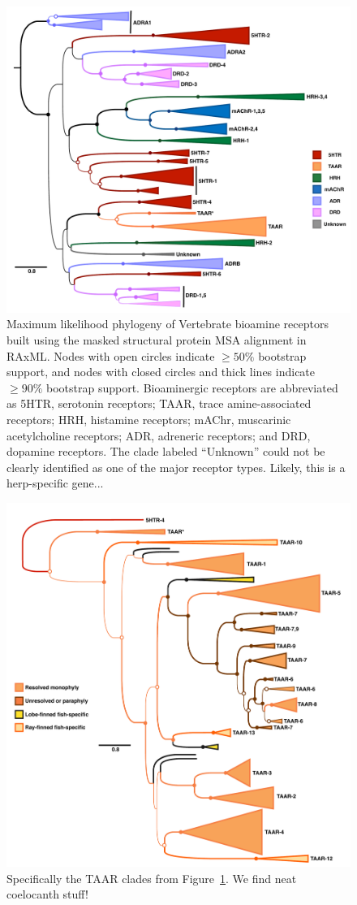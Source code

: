 \documentclass[fleqn,10pt]{wlpeerj}
\begin{document}
\begin{figure}[htbp]
	\centerline{\includegraphics[width=18cm]{figures/masked_part_phylogeny.pdf}}
	\caption{\label{phylogeny} Maximum likelihood phylogeny of Vertebrate bioamine receptors built using the masked structural protein MSA alignment in RAxML. Nodes with open circles indicate $\geq 50\%$ bootstrap support, and nodes with closed circles and thick lines indicate $\geq 90\%$ bootstrap support. Bioaminergic receptors are abbreviated as 5HTR, serotonin receptors; TAAR, trace amine-associated receptors; HRH, histamine receptors; mAChr, muscarinic acetylcholine receptors; ADR, adreneric receptors; and DRD, dopamine receptors. The clade labeled ``Unknown'' could not be clearly identified as one of the major receptor types. Likely, this is a herp-specific gene...}
\end{figure}


\newpage

\begin{figure}[htbp]
	\centerline{\includegraphics[width=15cm]{figures/taar_phylogeny.pdf}}
	\caption{\label{taar_tree} Specifically the TAAR clades from Figure~\ref{phylogeny}. We find neat coelocanth stuff!}
\end{figure}
\end{document}
